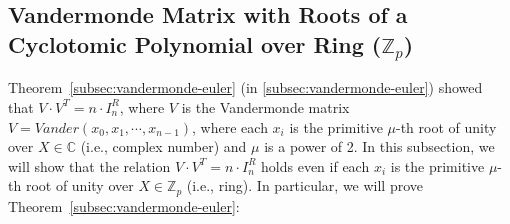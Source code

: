 \subsection{Vandermonde Matrix with Roots of a Cyclotomic Polynomial over Ring ($\mathbb{Z}_p$)}
\label{subsec:vandermonde-euler-integer-ring}

Theorem~\ref*{subsec:vandermonde-euler} (in \autoref{subsec:vandermonde-euler}) showed that $V \cdot V^T = n \cdot I^R_n$, where $V$ is the Vandermonde matrix $V = \mathit{Vander}(x_0, x_1, \cdots, x_{n-1})$, where each $x_i$ is the primitive $\mu$-th root of unity over $X \in \mathbb{C}$ (i.e., complex number) and $\mu$ is a power of 2. In this subsection, we will show that the relation $V \cdot V^T = n \cdot I^R_n$ holds even if each $x_i$ is the primitive $\mu$-th root of unity over $X \in \mathbb{Z}_p$ (i.e., ring). In particular, we will prove Theorem~\ref*{subsec:vandermonde-euler}: 


